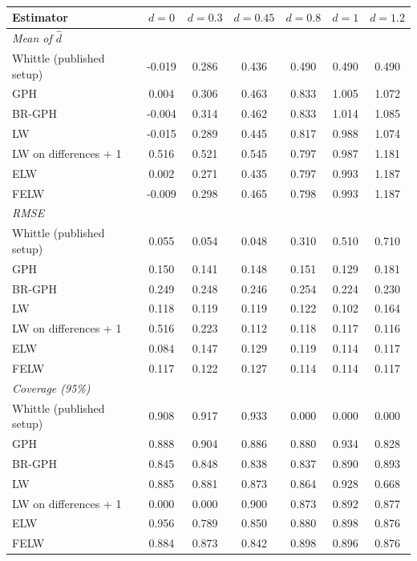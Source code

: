 \begin{table}[!htbp]
\fontsize{7}{8}\selectfont
\caption{}
\centering
\begin{tabular}{lcccccc}
\hline
Estimator & $d=0$ & $d=0.3$ & $d=0.45$ & $d=0.8$ & $d=1$ & $d=1.2$ \\ \hline
\multicolumn{7}{l}{\textit{Mean of $\hat{d}$}} \\
Whittle (published setup) & -0.019 & 0.286 & 0.436 & 0.490 & 0.490 & 0.490 \\
GPH & 0.004 & 0.306 & 0.463 & 0.833 & 1.005 & 1.072 \\
BR-GPH & -0.004 & 0.314 & 0.462 & 0.833 & 1.014 & 1.085 \\
LW & -0.015 & 0.289 & 0.445 & 0.817 & 0.988 & 1.074 \\
LW on differences + 1 & 0.516 & 0.521 & 0.545 & 0.797 & 0.987 & 1.181 \\
ELW & 0.002 & 0.271 & 0.435 & 0.797 & 0.993 & 1.187 \\
FELW & -0.009 & 0.298 & 0.465 & 0.798 & 0.993 & 1.187 \\
\multicolumn{7}{l}{\textit{RMSE}} \\
Whittle (published setup) & 0.055 & 0.054 & 0.048 & 0.310 & 0.510 & 0.710 \\
GPH & 0.150 & 0.141 & 0.148 & 0.151 & 0.129 & 0.181 \\
BR-GPH & 0.249 & 0.248 & 0.246 & 0.254 & 0.224 & 0.230 \\
LW & 0.118 & 0.119 & 0.119 & 0.122 & 0.102 & 0.164 \\
LW on differences + 1 & 0.516 & 0.223 & 0.112 & 0.118 & 0.117 & 0.116 \\
ELW & 0.084 & 0.147 & 0.129 & 0.119 & 0.114 & 0.117 \\
FELW & 0.117 & 0.122 & 0.127 & 0.114 & 0.114 & 0.117 \\
\multicolumn{7}{l}{\textit{Coverage (95\%)}} \\
Whittle (published setup) & 0.908 & 0.917 & 0.933 & 0.000 & 0.000 & 0.000 \\
GPH & 0.888 & 0.904 & 0.886 & 0.880 & 0.934 & 0.828 \\
BR-GPH & 0.845 & 0.848 & 0.838 & 0.837 & 0.890 & 0.893 \\
LW & 0.885 & 0.881 & 0.873 & 0.864 & 0.928 & 0.668 \\
LW on differences + 1 & 0.000 & 0.000 & 0.900 & 0.873 & 0.892 & 0.877 \\
ELW & 0.956 & 0.789 & 0.850 & 0.880 & 0.898 & 0.876 \\
FELW & 0.884 & 0.873 & 0.842 & 0.898 & 0.896 & 0.876 \\
\hline
\end{tabular}
\label{tab:lm_montecarlo}
\end{table}
